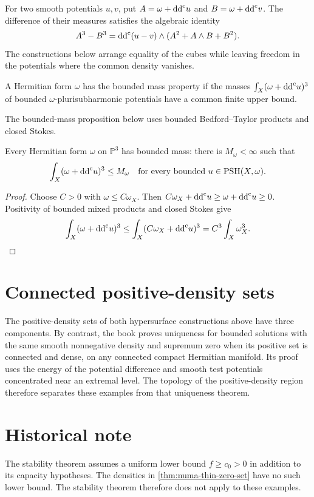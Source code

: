 For two smooth potentials $u,v$, put $A=\omega+\mathrm{dd}^{\mathrm{c}} u$ and $B=\omega+\mathrm{dd}^{\mathrm{c}} v$. The difference of their measures satisfies the algebraic identity
\begin{equation}\label{uni-eq:linearization}
 A^3-B^3=\mathrm{dd}^{\mathrm{c}}(u-v)\wedge(A^2+A\wedge B+B^2).
\end{equation}
The constructions below arrange equality of the cubes while leaving freedom in the potentials where the common density vanishes.

\begin{definition}\label{def:bmp}
A Hermitian form $\omega$ has the bounded mass property if the masses $\int_X(\omega+\mathrm{dd}^{\mathrm{c}} u)^3$ of bounded $\omega$-plurisubharmonic potentials have a common finite upper bound.
\end{definition}

The bounded-mass proposition below uses bounded Bedford--Taylor products and closed Stokes.

\begin{proposition}\label{prop:bmp-metric}
Every Hermitian form $\omega$ on $\mathbb P^3$ has bounded mass: there is $M_\omega<\infty$ such that
\[
 \int_X(\omega+\mathrm{dd}^{\mathrm{c}} u)^3\leq M_\omega
 \quad\text{for every bounded }u\in\mathrm{PSH}(X,\omega).
\]
\end{proposition}
\begin{proof}
Choose $C>0$ with $\omega\leq C\omega_X$. Then $C\omega_X+\mathrm{dd}^{\mathrm{c}} u\geq\omega+\mathrm{dd}^{\mathrm{c}} u\geq0$. Positivity of bounded mixed products and closed Stokes give
\[
 \int_X(\omega+\mathrm{dd}^{\mathrm{c}} u)^3
 \leq\int_X(C\omega_X+\mathrm{dd}^{\mathrm{c}} u)^3
 =C^3\int_X\omega_X^3.
\]
\end{proof}





\section{Connected positive-density sets}
The positive-density sets of both hypersurface constructions above have three components. By contrast, the book proves uniqueness for bounded solutions with the same smooth nonnegative density and supremum zero when its positive set is connected and dense, on any connected compact Hermitian manifold. Its proof uses the energy of the potential difference and smooth test potentials concentrated near an extremal level. The topology of the positive-density region therefore separates these examples from that uniqueness theorem.

\section{Historical note}
The stability theorem \cite[Theorem 4.1]{KN21} assumes a uniform lower bound $f\geq c_0>0$ in addition to its capacity hypotheses. The densities in \cref{thm:numa-thin-zero-set} have no such lower bound. The stability theorem therefore does not apply to these examples.

\backmatter



